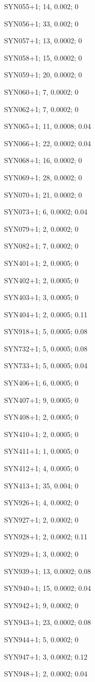 SYN055+1; 14, 0.002; 0

SYN056+1; 33, 0.002; 0

SYN057+1; 13, 0.0002; 0

SYN058+1; 15, 0.0002; 0

SYN059+1; 20, 0.0002; 0

SYN060+1; 7, 0.0002; 0

SYN062+1; 7, 0.0002; 0

SYN065+1; 11, 0.0008; 0.04

SYN066+1; 22, 0.0002; 0.04

SYN068+1; 16, 0.0002; 0

SYN069+1; 28, 0.0002; 0

SYN070+1; 21, 0.0002; 0

SYN073+1; 6, 0.0002; 0.04

SYN079+1; 2, 0.0002; 0

SYN082+1; 7, 0.0002; 0

SYN401+1; 2, 0.0005; 0

SYN402+1; 2, 0.0005; 0

SYN403+1; 3, 0.0005; 0

SYN404+1; 2, 0.0005; 0.11

SYN918+1; 5, 0.0005; 0.08

SYN732+1; 5, 0.0005; 0.08

SYN733+1; 5, 0.0005; 0.04

SYN406+1; 6, 0.0005; 0

SYN407+1; 9, 0.0005; 0

SYN408+1; 2, 0.0005; 0

SYN410+1; 2, 0.0005; 0

SYN411+1; 1, 0.0005; 0

SYN412+1; 4, 0.0005; 0

SYN413+1; 35, 0.004; 0

SYN926+1; 4, 0.0002; 0

SYN927+1; 2, 0.0002; 0

SYN928+1; 2, 0.0002; 0.11

SYN929+1; 3, 0.0002; 0

SYN939+1; 13, 0.0002; 0.08

SYN940+1; 15, 0.0002; 0.04

SYN942+1; 9, 0.0002; 0

SYN943+1; 23, 0.0002; 0.08

SYN944+1; 5, 0.0002; 0

SYN947+1; 3, 0.0002; 0.12

SYN948+1; 2, 0.0002; 0.04

